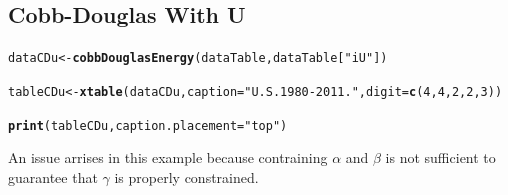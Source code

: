 \documentclass[preprint,authoryear,12pt]{elsarticle}\usepackage{graphicx, color}
\makeatletter
\newcommand{\hlfunctioncall}[1]{\textcolor[rgb]{0.501960784313725,0,0.329411764705882}{\textbf{#1}}}%
\newcommand{\hlstring}[1]{\textcolor[rgb]{0.6,0.6,1}{#1}}%
\newenvironment{kframe}{%
 \def\at@end@of@kframe{}%
 \ifinner\ifhmode%
  \def\at@end@of@kframe{\end{minipage}}%
  \begin{minipage}{\columnwidth}%
 \fi\fi%
 \def\FrameCommand##1{\hskip\@totalleftmargin \hskip-\fboxsep
 \colorbox{shadecolor}{##1}\hskip-\fboxsep
     \hskip-\linewidth \hskip-\@totalleftmargin \hskip\columnwidth}%
 \MakeFramed {\advance\hsize-\width
   \@totalleftmargin\z@ \linewidth\hsize
   \@setminipage}}%
 {\par\unskip\endMakeFramed%
 \at@end@of@kframe}
\newenvironment{knitrout}{}{} %
\makeatother
\begin{document}
\subsection{Cobb-Douglas With U}

\begin{knitrout}
\color{fgcolor}\begin{kframe}
\begin{alltt}
dataCDu <- \hlfunctioncall{cobbDouglasEnergy}(dataTable, dataTable[\hlstring{"iU"}])
\end{alltt}


{\ttfamily\noindent\bfseries\color{errorcolor}{Error: Missing value or an infinity produced when evaluating the model}}\begin{alltt}
tableCDu <- \hlfunctioncall{xtable}(dataCDu, caption=\hlstring{"U.S. 1980-2011."}, digit = \hlfunctioncall{c}(4, 4, 2, 2, 3))
\end{alltt}


{\ttfamily\noindent\bfseries\color{errorcolor}{Error: object 'dataCDu' not found}}\end{kframe}
\end{knitrout}


\begin{kframe}
\begin{alltt}
\hlfunctioncall{print}(tableCDu, caption.placement=\hlstring{"top"})
\end{alltt}


{\ttfamily\noindent\bfseries\color{errorcolor}{Error: error in evaluating the argument 'x' in selecting a method for function 'print': Error: object 'tableCDu' not found}}\end{kframe}





An issue arrises in this example because contraining $\alpha$ and $\beta$ is not sufficient to 
guarantee that $\gamma$ is properly constrained.
\end{document}
